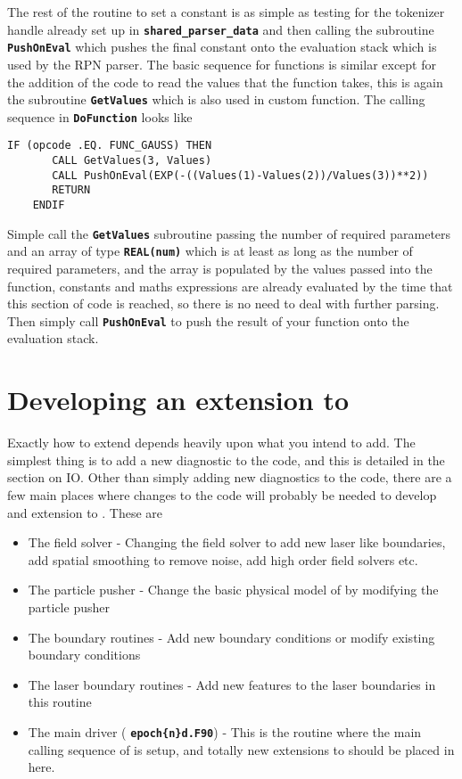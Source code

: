 \documentclass[12pt,a4paper]{article}
\newcommand{\simpleboxverbatim}{\begin{Verbatim}[obeytabs=true,frame=single,
  framerule=0.5mm,rulecolor=\color{warwickmid},formatcom=\color{black}]}
\newcommand{\inlinecode}[1]{{\color{warwickred} \bf\texttt{#1}}}
\newcommand{\EPOCH}{{\color{warwickdark}\fontfamily{phv}\selectfont{EPOCH}}}
\begin{document}
The rest of the routine to set a constant is as simple as testing for the
tokenizer handle already set up in \inlinecode{shared\_parser\_data} and then
calling the subroutine \inlinecode{PushOnEval} which pushes the final constant
onto the evaluation stack which is used by the RPN parser. The basic sequence
for functions is similar except for the addition of the code to read the values
that the function takes, this is again the subroutine \inlinecode{GetValues}
which is also used in custom function. The calling sequence in
\inlinecode{DoFunction} looks like

\simpleboxverbatim
    IF (opcode .EQ. FUNC_GAUSS) THEN
       CALL GetValues(3, Values)
       CALL PushOnEval(EXP(-((Values(1)-Values(2))/Values(3))**2))
       RETURN
    ENDIF
\end{Verbatim}
Simple call the \inlinecode{GetValues} subroutine passing the number of
required parameters and an array of type \inlinecode{REAL(num)} which is at
least as long as the number of required parameters, and the array is populated
by the values passed into the function, constants and maths expressions are
already evaluated by the time that this section of code is reached, so there is
no need to deal with further parsing. Then simply call \inlinecode{PushOnEval}
to push the result of your function onto the evaluation stack.

\section{Developing an extension to {\EPOCH}}

Exactly how to extend {\EPOCH} depends heavily upon what you intend to add. The
simplest thing is to add a new diagnostic to the code, and this is detailed in
the section on {\EPOCH} IO. Other than simply adding new diagnostics to the code,
there are a few main places where changes to the code will probably be needed
to develop and extension to \EPOCH. These are
\begin{itemize}
\item The field solver - Changing the field solver to add new laser like
  boundaries, add spatial smoothing to remove noise, add high order field
  solvers etc.
\item The particle pusher - Change the basic physical model of {\EPOCH} by
  modifying the particle pusher
\item The boundary routines - Add new boundary conditions or modify existing
  boundary conditions
\item The laser boundary routines - Add new features to the laser boundaries in
  this routine
\item The main driver (\inlinecode{epoch\{n\}d.F90}) - This is the routine
  where the main calling sequence of {\EPOCH} is setup, and totally new
  extensions to {\EPOCH} should be placed in here.
\end{itemize}
\end{document}
